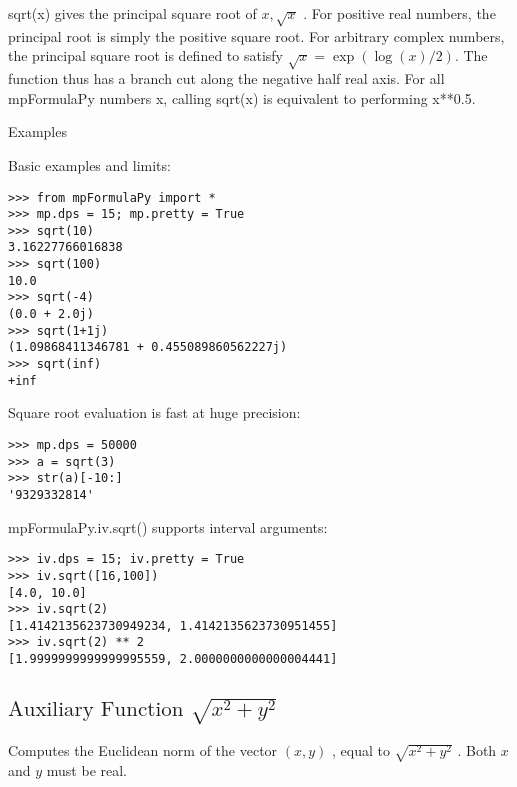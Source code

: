 \vspace{0.3cm}


sqrt(x) gives the principal square root of $x,\sqrt{x}$ . For positive real numbers, the principal
root is simply the positive square root. For arbitrary complex numbers, the principal
square root is defined to satisfy $\sqrt{x}=\exp(\log(x)/2)$. The function thus has a branch cut along the negative half real axis.
For all mpFormulaPy numbers x, calling sqrt(x) is equivalent to performing x**0.5.

Examples

Basic examples and limits:
\begin{lstlisting}
>>> from mpFormulaPy import *
>>> mp.dps = 15; mp.pretty = True
>>> sqrt(10)
3.16227766016838
>>> sqrt(100)
10.0
>>> sqrt(-4)
(0.0 + 2.0j)
>>> sqrt(1+1j)
(1.09868411346781 + 0.455089860562227j)
>>> sqrt(inf)
+inf
\end{lstlisting}


Square root evaluation is fast at huge precision:
\begin{lstlisting}
>>> mp.dps = 50000
>>> a = sqrt(3)
>>> str(a)[-10:]
'9329332814'
\end{lstlisting}


mpFormulaPy.iv.sqrt() supports interval arguments:
\begin{lstlisting}
>>> iv.dps = 15; iv.pretty = True
>>> iv.sqrt([16,100])
[4.0, 10.0]
>>> iv.sqrt(2)
[1.4142135623730949234, 1.4142135623730951455]
>>> iv.sqrt(2) ** 2
[1.9999999999999995559, 2.0000000000000004441]
\end{lstlisting}



\subsection{\texorpdfstring{$\text{Auxiliary Function }\sqrt{x^2+y^2}$}{Hypot}}
Computes the Euclidean norm of the vector $(x, y)$ , equal to $\sqrt{x^2+y^2}$ . Both $x$ and $y$ must be real.



